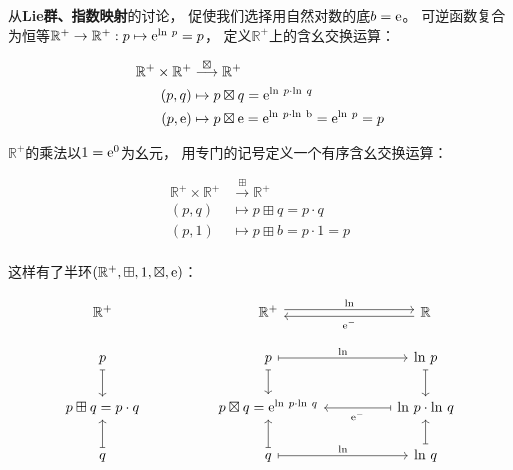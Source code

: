 ﻿\documentclass[10pt,a4paper]{article}
\newcommand{\sqplus}{\mathbin{\boxplus}}
\newcommand{\sqtimes}{\mathbin{\boxtimes}}
\begin{document}
从\textbf{Lie群、指数映射}的讨论，
促使我们选择用自然对数的底$b = \text e$。
可逆函数复合为恒等$\mathbb R^+ \to \mathbb R^+: p \mapsto \text e^{\text{ln} \ p} = p$，
定义$\mathbb R^+$上的含幺交换运算：

$$
\begin{aligned}
\mathbb R^+ \times \mathbb R^+ &\stackrel{\sqtimes}{\longrightarrow} \mathbb R^+ \\    
(p,q) &\mapsto p \sqtimes q = \text e^{\text{ln} \ p \cdot \text{ln} \ q} \\
(p,\text e) &\mapsto p \sqtimes \text e = \text e^{\text{ln} \ p \cdot \text{ln} \ \text b} = \text e^{\text{ln} \ p} = p \\
\end{aligned}
$$

$\mathbb R^+$的乘法以$1 = \text e^0$为幺元，
用专门的记号定义一个有序含幺交换运算：

$$
\begin{aligned}
\mathbb R^+ \times \mathbb R^+ &\stackrel{\sqplus}{\longrightarrow} \mathbb R^+ \\    
(p,q) &\mapsto p \sqplus q = p \cdot q \\
(p,1) &\mapsto p \sqplus b = p \cdot 1 = p \\
\end{aligned}
$$

这样有了半环$(\mathbb R^+,\sqplus,1,\sqtimes,\text e)$：

$$
\begin{tikzcd}
\mathbb R^+             &  & \mathbb R^+ \arrow[rr, "\text{ln}", shift left]               &  & \mathbb R \arrow[ll, "\text e^-", shift left]                          \\
p \arrow[d, maps to]    &  & p \arrow[rr, "\text{ln}", maps to] \arrow[d, maps to]         &  & \text{ln} \ p \arrow[d, maps to]                                       \\
p \sqplus q = p \cdot q &  & p \sqtimes q =\text e^{\text{ln} \ p \cdot \text{ln} \ q} &  & \text{ln} \ p \cdot \text{ln} \ q \arrow[ll, "\text e^-", maps to] \\
q \arrow[u, maps to]    &  & q \arrow[rr, "\text{ln}", maps to] \arrow[u, maps to]         &  & \text{ln} \ q \arrow[u, maps to]                                      
\end{tikzcd}
$$
\end{document}
